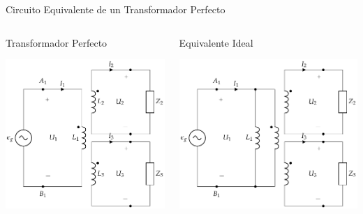 \documentclass[aspectratio=169, usenames,svgnames,dvipsnames]{beamer}
\begin{document}
\begin{frame}[label={sec:orgc101332}]{Circuito Equivalente de un Transformador Perfecto}
\vspace{0.3cm}
\begin{columns}
\begin{column}[t]{0.5\columnwidth}
Transformador Perfecto
\begin{center}
\includegraphics[width=\textwidth]{../figs/TrafoPerfectoVariosDevanados_Impedancia.pdf}
\end{center}
\end{column}

\begin{column}[t]{0.5\columnwidth}
Equivalente Ideal
\begin{center}
\includegraphics[width=\textwidth]{../figs/TrafoPerfectoIdealVariosDevanados_Impedancia.pdf}
\end{center}
\end{column}
\end{columns}
\end{frame}
\end{document}
